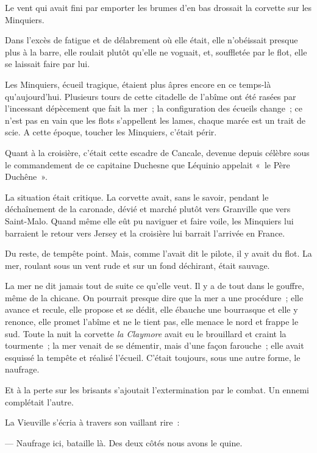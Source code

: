 \documentclass[french,twoside]{book} %
\begin{document}
Le vent qui avait fini par emporter les brumes d’en bas drossait la corvette sur les Minquiers.\par
Dans l’excès de fatigue et de délabrement où elle était, elle n’obéissait presque plus à la barre, elle roulait plutôt qu’elle ne voguait, et, souffletée par le flot, elle se laissait faire par lui.\par
Les Minquiers, écueil tragique, étaient plus âpres encore en ce temps-là qu’aujourd’hui. Plusieurs tours de cette citadelle de l’abîme ont été rasées par l’incessant dépècement que fait la mer ; la configuration des écueils change ; ce n’est pas en vain que les flots s’appellent les lames, chaque marée est un trait de scie. A cette époque, toucher les Minquiers, c’était périr.\par
Quant à la croisière, c’était cette escadre de Cancale, devenue depuis célèbre sous le commandement de ce capitaine Duchesne que Léquinio appelait « le Père Duchêne ».\par
La situation était critique. La corvette avait, sans  le savoir, pendant le déchaînement de la caronade, dévié et marché plutôt vers Granville que vers Saint-Malo. Quand même elle eût pu naviguer et faire voile, les Minquiers lui barraient le retour vers Jersey et la croisière lui barrait l’arrivée en France.\par
Du reste, de tempête point. Mais, comme l’avait dit le pilote, il y avait du flot. La mer, roulant sous un vent rude et sur un fond déchirant, était sauvage.\par
La mer ne dit jamais tout de suite ce qu’elle veut. Il y a de tout dans le gouffre, même de la chicane. On pourrait presque dire que la mer a une procédure ; elle avance et recule, elle propose et se dédit, elle ébauche une bourrasque et elle y renonce, elle promet l’abîme et ne le tient pas, elle menace le nord et frappe le sud. Toute la nuit la corvette \emph{la Claymore} avait eu le brouillard et craint la tourmente ; la mer venait de se démentir, mais d’une façon farouche ; elle avait esquissé la tempête et réalisé l’écueil. C’était toujours, sous une autre forme, le naufrage.\par
Et à la perte sur les brisants s’ajoutait l’extermination par le combat. Un ennemi complétait l’autre.\par
La Vieuville s’écria à travers son vaillant rire :\par
— Naufrage ici, bataille là. Des deux côtés nous avons le quine.
\end{document}
